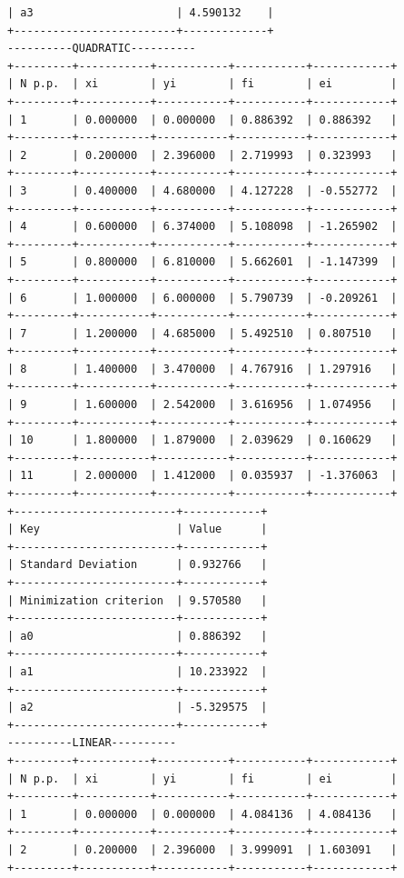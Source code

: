 \documentclass[12pt,one column]{article}
\begin{document}
\begin{verbatim}
| a3                      | 4.590132    | 
+-------------------------+-------------+
----------QUADRATIC----------
+---------+-----------+-----------+-----------+------------+
| N p.p.  | xi        | yi        | fi        | ei         | 
+---------+-----------+-----------+-----------+------------+
| 1       | 0.000000  | 0.000000  | 0.886392  | 0.886392   | 
+---------+-----------+-----------+-----------+------------+
| 2       | 0.200000  | 2.396000  | 2.719993  | 0.323993   | 
+---------+-----------+-----------+-----------+------------+
| 3       | 0.400000  | 4.680000  | 4.127228  | -0.552772  | 
+---------+-----------+-----------+-----------+------------+
| 4       | 0.600000  | 6.374000  | 5.108098  | -1.265902  | 
+---------+-----------+-----------+-----------+------------+
| 5       | 0.800000  | 6.810000  | 5.662601  | -1.147399  | 
+---------+-----------+-----------+-----------+------------+
| 6       | 1.000000  | 6.000000  | 5.790739  | -0.209261  | 
+---------+-----------+-----------+-----------+------------+
| 7       | 1.200000  | 4.685000  | 5.492510  | 0.807510   | 
+---------+-----------+-----------+-----------+------------+
| 8       | 1.400000  | 3.470000  | 4.767916  | 1.297916   | 
+---------+-----------+-----------+-----------+------------+
| 9       | 1.600000  | 2.542000  | 3.616956  | 1.074956   | 
+---------+-----------+-----------+-----------+------------+
| 10      | 1.800000  | 1.879000  | 2.039629  | 0.160629   | 
+---------+-----------+-----------+-----------+------------+
| 11      | 2.000000  | 1.412000  | 0.035937  | -1.376063  | 
+---------+-----------+-----------+-----------+------------+
+-------------------------+------------+
| Key                     | Value      | 
+-------------------------+------------+
| Standard Deviation      | 0.932766   | 
+-------------------------+------------+
| Minimization criterion  | 9.570580   | 
+-------------------------+------------+
| a0                      | 0.886392   | 
+-------------------------+------------+
| a1                      | 10.233922  | 
+-------------------------+------------+
| a2                      | -5.329575  | 
+-------------------------+------------+
----------LINEAR----------
+---------+-----------+-----------+-----------+------------+
| N p.p.  | xi        | yi        | fi        | ei         | 
+---------+-----------+-----------+-----------+------------+
| 1       | 0.000000  | 0.000000  | 4.084136  | 4.084136   | 
+---------+-----------+-----------+-----------+------------+
| 2       | 0.200000  | 2.396000  | 3.999091  | 1.603091   | 
+---------+-----------+-----------+-----------+------------+

\end{verbatim}
\end{document}

